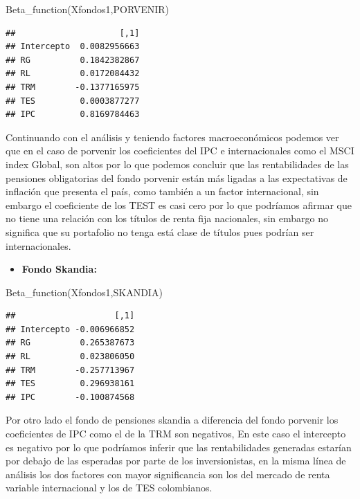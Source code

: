\documentclass[
  12pt,
]{article}
\newenvironment{Shaded}{\begin{snugshade}}{\end{snugshade}}
\newcommand{\FunctionTok}[1]{\textcolor[rgb]{0.00,0.00,0.00}{#1}}
\newcommand{\NormalTok}[1]{#1}
\providecommand{\tightlist}{%
  \setlength{\itemsep}{0pt}\setlength{\parskip}{0pt}}
\begin{document}
\begin{Shaded}
\begin{Highlighting}[]
\FunctionTok{Beta\_function}\NormalTok{(Xfondos1,PORVENIR)}
\end{Highlighting}
\end{Shaded}

\begin{verbatim}
##                     [,1]
## Intercepto  0.0082956663
## RG          0.1842382867
## RL          0.0172084432
## TRM        -0.1377165975
## TES         0.0003877277
## IPC         0.8169784463
\end{verbatim}

Continuando con el análisis y teniendo factores macroeconómicos podemos
ver que en el caso de porvenir los coeficientes del IPC e
internacionales como el MSCI index Global, son altos por lo que podemos
concluir que las rentabilidades de las pensiones obligatorias del fondo
porvenir están más ligadas a las expectativas de inflación que presenta
el país, como también a un factor internacional, sin embargo el
coeficiente de los TEST es casi cero por lo que podríamos afirmar que no
tiene una relación con los títulos de renta fija nacionales, sin embargo
no significa que su portafolio no tenga está clase de títulos pues
podrían ser internacionales.

\begin{itemize}
\tightlist
\item
  \textbf{Fondo Skandia:}
\end{itemize}

\begin{Shaded}
\begin{Highlighting}[]
\FunctionTok{Beta\_function}\NormalTok{(Xfondos1,SKANDIA)}
\end{Highlighting}
\end{Shaded}

\begin{verbatim}
##                    [,1]
## Intercepto -0.006966852
## RG          0.265387673
## RL          0.023806050
## TRM        -0.257713967
## TES         0.296938161
## IPC        -0.100874568
\end{verbatim}

Por otro lado el fondo de pensiones skandia a diferencia del fondo
porvenir los coeficientes de IPC como el de la TRM son negativos, En
este caso el intercepto es negativo por lo que podríamos inferir que las
rentabilidades generadas estarían por debajo de las esperadas por parte
de los inversionistas, en la misma línea de análisis los dos factores
con mayor significancia son los del mercado de renta variable
internacional y los de TES colombianos.
\end{document}
